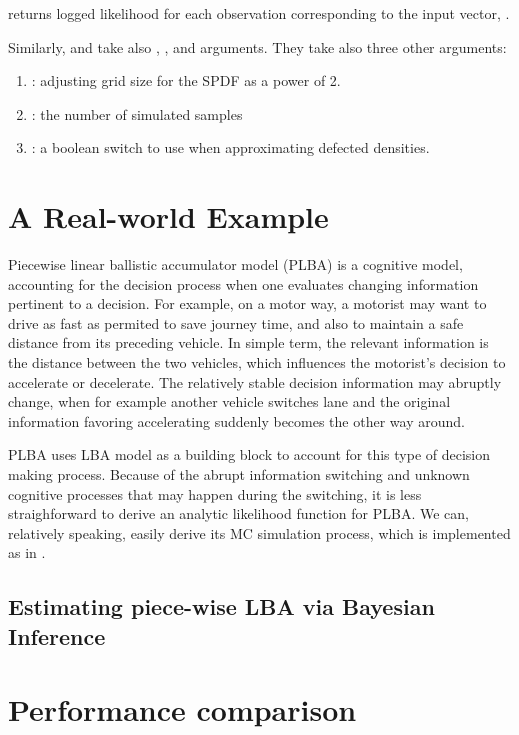 \documentclass[shortnames,nojss,article]{jss}
\begin{document}
 returns logged likelihood for each observation corresponding 
to the input vector, .  

Similarly,  and  take also , 
,  and  arguments. They take also three other 
arguments: 

\begin{enumerate}
\item {}: adjusting grid size for the SPDF as a power of 2. 
\item {}: the number of simulated samples  
\item {}: a boolean switch to use  when approximating 
defected densities.
\end{enumerate}

\section{A Real-world Example}
\label{sec:rwexample}

Piecewise linear ballistic accumulator model (PLBA) is a cognitive model, 
accounting for the decision process when one evaluates changing information 
pertinent to a decision.  For example, on a motor way, a motorist may want 
to drive as fast as permited to save journey time, and also to maintain a 
safe distance from its preceding vehicle.  In simple term, the relevant 
information is the
distance between the two vehicles, which influences the motorist's decision to
accelerate or decelerate.  The relatively stable decision information may 
abruptly change, when for example another vehicle switches lane and the 
original information favoring accelerating suddenly becomes the other way 
around.

PLBA uses LBA model as a building block to account for this type of decision 
making process.  Because of the abrupt information switching and unknown 
cognitive processes that may happen during the switching, it is less 
straighforward to derive an analytic likelihood function for PLBA.  We can, 
relatively speaking, easily derive its MC simulation process, which is
implemented as  in . 


\subsection{Estimating piece-wise LBA via Bayesian Inference}


\section{Performance comparison}
\label{sec:perfcomp}
\end{document}
